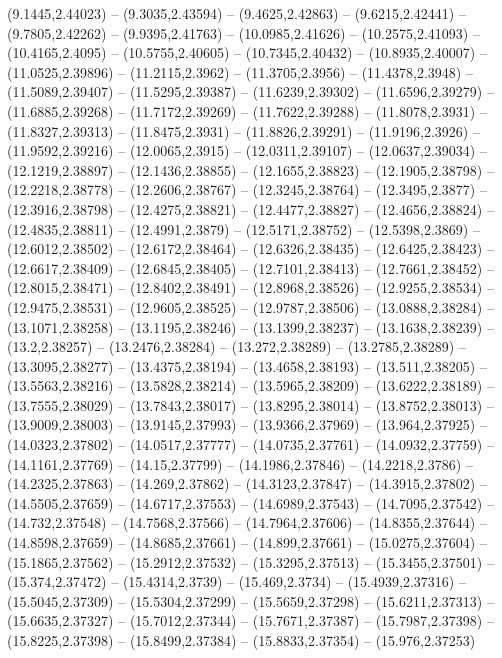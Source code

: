 {(9.1445,2.44023) -- (9.3035,2.43594) -- (9.4625,2.42863) -- (9.6215,2.42441) -- (9.7805,2.42262) -- (9.9395,2.41763) -- (10.0985,2.41626) -- (10.2575,2.41093) -- (10.4165,2.4095) -- (10.5755,2.40605) -- (10.7345,2.40432) -- (10.8935,2.40007) --
(11.0525,2.39896) -- (11.2115,2.3962) -- (11.3705,2.3956) -- (11.4378,2.3948) -- (11.5089,2.39407) -- (11.5295,2.39387) -- (11.6239,2.39302) -- (11.6596,2.39279) -- (11.6885,2.39268) -- (11.7172,2.39269) -- (11.7622,2.39288) -- (11.8078,2.3931) -- (11.8327,2.39313) --
(11.8475,2.3931) -- (11.8826,2.39291) -- (11.9196,2.3926) -- (11.9592,2.39216) -- (12.0065,2.3915) -- (12.0311,2.39107) -- (12.0637,2.39034) -- (12.1219,2.38897) -- (12.1436,2.38855) -- (12.1655,2.38823) -- (12.1905,2.38798) -- (12.2218,2.38778) --
(12.2606,2.38767) -- (12.3245,2.38764) -- (12.3495,2.3877) -- (12.3916,2.38798) -- (12.4275,2.38821) -- (12.4477,2.38827) -- (12.4656,2.38824) -- (12.4835,2.38811) -- (12.4991,2.3879) -- (12.5171,2.38752) -- (12.5398,2.3869) -- (12.6012,2.38502) --
(12.6172,2.38464) -- (12.6326,2.38435) -- (12.6425,2.38423) -- (12.6617,2.38409) -- (12.6845,2.38405) -- (12.7101,2.38413) -- (12.7661,2.38452) -- (12.8015,2.38471) -- (12.8402,2.38491) -- (12.8968,2.38526) -- (12.9255,2.38534) -- (12.9475,2.38531)
-- (12.9605,2.38525) -- (12.9787,2.38506) -- (13.0888,2.38284) -- (13.1071,2.38258) -- (13.1195,2.38246) -- (13.1399,2.38237) -- (13.1638,2.38239) -- (13.2,2.38257) -- (13.2476,2.38284) -- (13.272,2.38289) -- (13.2785,2.38289) -- (13.3095,2.38277)
-- (13.4375,2.38194) -- (13.4658,2.38193) -- (13.511,2.38205) -- (13.5563,2.38216) -- (13.5828,2.38214) -- (13.5965,2.38209) -- (13.6222,2.38189) -- (13.7555,2.38029) -- (13.7843,2.38017) -- (13.8295,2.38014) -- (13.8752,2.38013) --
(13.9009,2.38003) -- (13.9145,2.37993) -- (13.9366,2.37969) -- (13.964,2.37925) -- (14.0323,2.37802) -- (14.0517,2.37777) -- (14.0735,2.37761) -- (14.0932,2.37759) -- (14.1161,2.37769) -- (14.15,2.37799) -- (14.1986,2.37846) -- (14.2218,2.3786) --
(14.2325,2.37863) -- (14.269,2.37862) -- (14.3123,2.37847) -- (14.3915,2.37802) -- (14.5505,2.37659) -- (14.6717,2.37553) -- (14.6989,2.37543) -- (14.7095,2.37542) -- (14.732,2.37548) -- (14.7568,2.37566) -- (14.7964,2.37606) -- (14.8355,2.37644) --
(14.8598,2.37659) -- (14.8685,2.37661) -- (14.899,2.37661) -- (15.0275,2.37604) -- (15.1865,2.37562) -- (15.2912,2.37532) -- (15.3295,2.37513) -- (15.3455,2.37501) -- (15.374,2.37472) -- (15.4314,2.3739) -- (15.469,2.3734) -- (15.4939,2.37316) --
(15.5045,2.37309) -- (15.5304,2.37299) -- (15.5659,2.37298) -- (15.6211,2.37313) -- (15.6635,2.37327) -- (15.7012,2.37344) -- (15.7671,2.37387) -- (15.7987,2.37398) -- (15.8225,2.37398) -- (15.8499,2.37384) -- (15.8833,2.37354) -- (15.976,2.37253)
}
